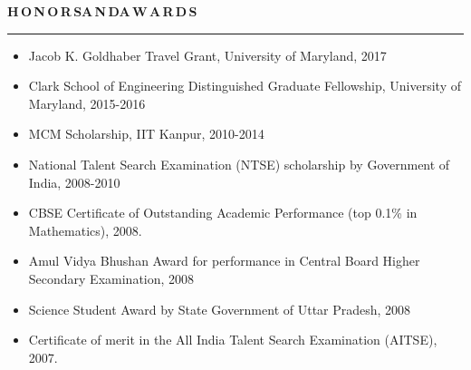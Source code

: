 \documentclass[11pt, a4paper]{article}
\begin{document}
%

\vspace{15pt}

\textbf{H\,O\,N\,O\,R\,S{\hspace{0.6em}}A\,N\,D{\hspace{0.6em}}A\,W\,A\,R\,D\,S}
\vspace{5pt}
\hrule
\vspace{-3pt}
\begin{itemize}[leftmargin=*] \itemsep1pt \parskip0pt 
\item Jacob K. Goldhaber Travel Grant, University of Maryland, 2017
\item Clark School of Engineering Distinguished Graduate Fellowship, University of Maryland, 2015-2016
\item MCM Scholarship, IIT Kanpur, 2010-2014
\item National Talent Search Examination (NTSE) scholarship by Government of India, 2008-2010
\item CBSE Certificate of Outstanding Academic Performance (top 0.1\% in Mathematics), 2008.
\item Amul Vidya Bhushan Award for performance in Central Board Higher Secondary Examination, 2008
\item Science Student Award by State Government of Uttar Pradesh, 2008
\item Certificate of merit in the All India Talent Search Examination (AITSE), 2007.
\end{itemize}

%
\end{document}
